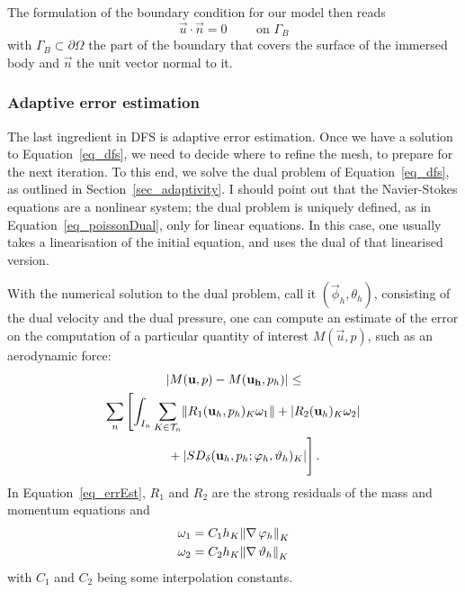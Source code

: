The formulation of the boundary condition for our model then reads
\begin{equation}
  \vec{u} \cdot \vec{n} = 0 \qquad \text{ on } \Gamma_B
  \label{eq_slipBC}
\end{equation}
with \(\Gamma_B \subset \partial \Omega\) the part of the boundary that covers the surface of the immersed body and  \(\vec{n}\) the unit vector normal to it.


\subsubsection{Adaptive error estimation}
\label{ssub_adaptivity}
The last ingredient in DFS is adaptive error estimation.
Once we have a solution to Equation~\eqref{eq_dfs}, we need to decide where to refine the mesh, to prepare for the next iteration.
To this end, we solve the dual problem of Equation~\eqref{eq_dfs}, as outlined in Section~\ref{sec_adaptivity}.
I should point out that the Navier-Stokes equations are a nonlinear system; the dual problem is uniquely defined, as in Equation~\eqref{eq_poissonDual}, only for linear equations.
In this case, one usually takes a linearisation of the initial equation, and uses the dual of that linearised version.

With the numerical solution to the dual problem, call it \((\vec{\phi}_h,\theta_h)\), consisting of the dual velocity and the dual pressure, one can compute an estimate of the error on the computation of a particular quantity of interest \(M(\vec{u}, p)\), such as an aerodynamic force:
\begin{multline}
  \abs*{M(\vec{u}, p) - M(\vec{u_h}, p_h)} \le \\
    \sum_n \left[ \int_{I_n} \sum_{K \in \mathcal{T}_n} \norm*{R_1(\vec{u}_h, p_h)_K \omega_1} 
      + \abs*{R_2(\vec{u}_h)_K \omega_2} \right. \\
      \left. \phantom{\sum_K}+ \abs*{SD_\delta(\vec{u}_h, p_h; \vec{\phi}_h, \theta_h)_K} \right].
  \label{eq_errEst}
\end{multline}
In Equation~\eqref{eq_errEst}, \(R_1\) and \(R_2\) are the strong residuals of the mass and momentum equations and
\begin{equation}
  \begin{aligned}
    \omega_1 &= C_1 h_K \norm*{\grad\phi_h}_K \\
    \omega_2 &= C_2 h_K \norm*{\grad\theta_h}_K
  \end{aligned}
  \label{eq_omegas}
\end{equation}
with \(C_1\) and \(C_2\) being some interpolation constants.

